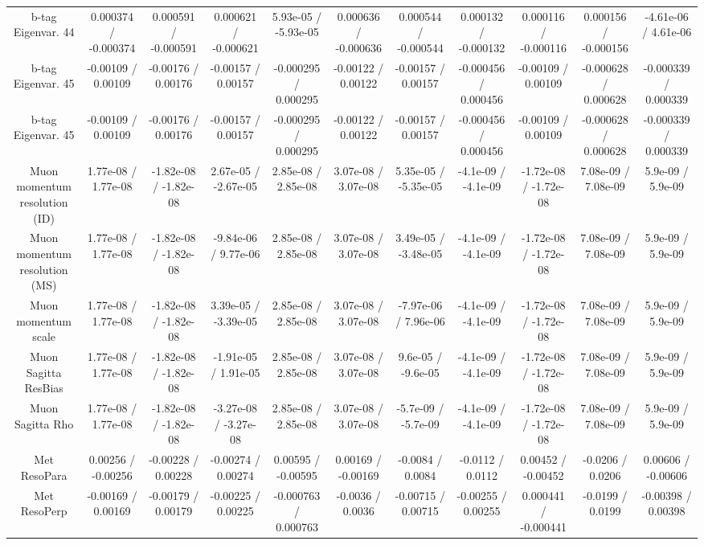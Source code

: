 \begin{table}[htbp]
\begin{center}
\begin{tabular}{|c|c|c|c|c|c|c|c|c|c|c|}
  b-tag Eigenvar. 44 & 0.000374 / -0.000374 & 0.000591 / -0.000591 & 0.000621 / -0.000621 & 5.93e-05 / -5.93e-05 & 0.000636 / -0.000636 & 0.000544 / -0.000544 & 0.000132 / -0.000132 & 0.000116 / -0.000116 & 0.000156 / -0.000156 & -4.61e-06 / 4.61e-06 \\ 
  b-tag Eigenvar. 45 & -0.00109 / 0.00109 & -0.00176 / 0.00176 & -0.00157 / 0.00157 & -0.000295 / 0.000295 & -0.00122 / 0.00122 & -0.00157 / 0.00157 & -0.000456 / 0.000456 & -0.00109 / 0.00109 & -0.000628 / 0.000628 & -0.000339 / 0.000339 \\ 
  b-tag Eigenvar. 45 & -0.00109 / 0.00109 & -0.00176 / 0.00176 & -0.00157 / 0.00157 & -0.000295 / 0.000295 & -0.00122 / 0.00122 & -0.00157 / 0.00157 & -0.000456 / 0.000456 & -0.00109 / 0.00109 & -0.000628 / 0.000628 & -0.000339 / 0.000339 \\ 
  Muon momentum resolution (ID) & 1.77e-08 / 1.77e-08 & -1.82e-08 / -1.82e-08 & 2.67e-05 / -2.67e-05 & 2.85e-08 / 2.85e-08 & 3.07e-08 / 3.07e-08 & 5.35e-05 / -5.35e-05 & -4.1e-09 / -4.1e-09 & -1.72e-08 / -1.72e-08 & 7.08e-09 / 7.08e-09 & 5.9e-09 / 5.9e-09 \\ 
  Muon momentum resolution (MS) & 1.77e-08 / 1.77e-08 & -1.82e-08 / -1.82e-08 & -9.84e-06 / 9.77e-06 & 2.85e-08 / 2.85e-08 & 3.07e-08 / 3.07e-08 & 3.49e-05 / -3.48e-05 & -4.1e-09 / -4.1e-09 & -1.72e-08 / -1.72e-08 & 7.08e-09 / 7.08e-09 & 5.9e-09 / 5.9e-09 \\ 
  Muon momentum scale & 1.77e-08 / 1.77e-08 & -1.82e-08 / -1.82e-08 & 3.39e-05 / -3.39e-05 & 2.85e-08 / 2.85e-08 & 3.07e-08 / 3.07e-08 & -7.97e-06 / 7.96e-06 & -4.1e-09 / -4.1e-09 & -1.72e-08 / -1.72e-08 & 7.08e-09 / 7.08e-09 & 5.9e-09 / 5.9e-09 \\ 
  Muon Sagitta ResBias & 1.77e-08 / 1.77e-08 & -1.82e-08 / -1.82e-08 & -1.91e-05 / 1.91e-05 & 2.85e-08 / 2.85e-08 & 3.07e-08 / 3.07e-08 & 9.6e-05 / -9.6e-05 & -4.1e-09 / -4.1e-09 & -1.72e-08 / -1.72e-08 & 7.08e-09 / 7.08e-09 & 5.9e-09 / 5.9e-09 \\ 
  Muon Sagitta Rho & 1.77e-08 / 1.77e-08 & -1.82e-08 / -1.82e-08 & -3.27e-08 / -3.27e-08 & 2.85e-08 / 2.85e-08 & 3.07e-08 / 3.07e-08 & -5.7e-09 / -5.7e-09 & -4.1e-09 / -4.1e-09 & -1.72e-08 / -1.72e-08 & 7.08e-09 / 7.08e-09 & 5.9e-09 / 5.9e-09 \\ 
  Met ResoPara & 0.00256 / -0.00256 & -0.00228 / 0.00228 & -0.00274 / 0.00274 & 0.00595 / -0.00595 & 0.00169 / -0.00169 & -0.0084 / 0.0084 & -0.0112 / 0.0112 & 0.00452 / -0.00452 & -0.0206 / 0.0206 & 0.00606 / -0.00606 \\ 
  Met ResoPerp & -0.00169 / 0.00169 & -0.00179 / 0.00179 & -0.00225 / 0.00225 & -0.000763 / 0.000763 & -0.0036 / 0.0036 & -0.00715 / 0.00715 & -0.00255 / 0.00255 & 0.000441 / -0.000441 & -0.0199 / 0.0199 & -0.00398 / 0.00398 \\ 

\end{tabular}
\end{center}
\end{table}

